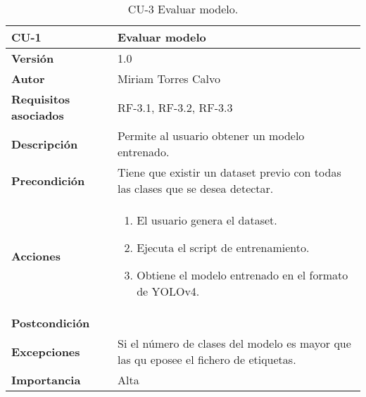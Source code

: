 \begin{table}[p]
  \centering
  \begin{tabularx}{\linewidth}{ p{} p{} }
  \toprule
  \textbf{CU-1} & \textbf{Evaluar modelo}\\
  \toprule
  \textbf{Versión} & 1.0\\
  \textbf{Autor} & Miriam Torres Calvo\\
  \textbf{Requisitos asociados} & RF-3.1, RF-3.2, RF-3.3\\
  \textbf{Descripción} & Permite al usuario obtener un modelo entrenado.\\
  \textbf{Precondición} & Tiene que existir un dataset previo con todas las clases que se desea detectar.\\
  \textbf{Acciones} &
  \begin{enumerate}
  \def\labelenumi{\arabic{enumi}.}
  \tightlist
  \item El usuario genera el dataset.
  \item Ejecuta el script de entrenamiento.
  \item Obtiene el modelo entrenado en el formato de YOLOv4.
  \end{enumerate}\\
  \textbf{Postcondición} & \\
  \textbf{Excepciones} & Si el número de clases del modelo es mayor que las qu eposee el fichero de etiquetas.\\
  \textbf{Importancia} & Alta \\
  \bottomrule
  \end{tabularx}
  \caption{CU-3 Evaluar modelo.}
\end{table}

